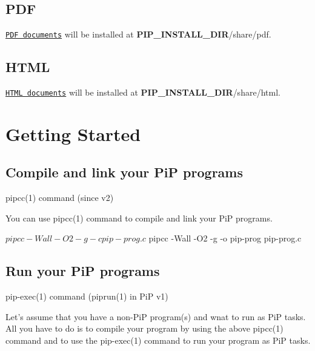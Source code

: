 \subsection*{P\-D\-F}

\href{doc/latex-inuse/libpip-manpages.pdf}{\tt P\-D\-F documents} will be installed at {\bfseries P\-I\-P\-\_\-\-I\-N\-S\-T\-A\-L\-L\-\_\-\-D\-I\-R}/share/pdf.

\subsection*{H\-T\-M\-L}

\href{doc/html/index.html}{\tt H\-T\-M\-L documents} will be installed at {\bfseries P\-I\-P\-\_\-\-I\-N\-S\-T\-A\-L\-L\-\_\-\-D\-I\-R}/share/html.

\section*{Getting Started}

\subsection*{Compile and link your Pi\-P programs}


\begin{DoxyItemize}
\item pipcc(1) command (since v2)
\end{DoxyItemize}

You can use pipcc(1) command to compile and link your Pi\-P programs. \begin{DoxyVerb}$ pipcc -Wall -O2 -g -c pip-prog.c
$ pipcc -Wall -O2 -g -o pip-prog pip-prog.c
\end{DoxyVerb}


\subsection*{Run your Pi\-P programs}


\begin{DoxyItemize}
\item pip-\/exec(1) command (piprun(1) in Pi\-P v1)
\end{DoxyItemize}

Let's assume that you have a non-\/\-Pi\-P program(s) and wnat to run as Pi\-P tasks. All you have to do is to compile your program by using the above pipcc(1) command and to use the pip-\/exec(1) command to run your program as Pi\-P tasks. 


